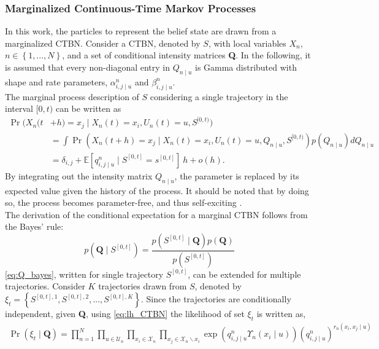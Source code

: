 \subsubsection{Marginalized Continuous-Time Markov Processes}
\label{sec:marg_ctbn}
In this work, the particles to represent the belief state are drawn from a marginalized CTBN. Consider a CTBN, denoted by $ S $, with local variables $ X_n $, $ n\in \left\lbrace 1,...,N \right\rbrace $, and a set of conditional intensity matrices \textbf{Q}. In the following, it is assumed that every non-diagonal entry in $ Q_{n\mid u} $ is Gamma distributed with shape and rate parameters, $ \alpha^n_{i,j\mid u} $ and $ \beta^n_{i,j\mid u} $.\\
The marginal process description of $ S $ considering a single trajectory in the interval $ [0,t) $ can be written as
\begin{align}
\operatorname{Pr}(X_n(t &+ h) = x_j \mid X_n(t)=x_i, U_n(t)=u, S^{[0, t)})\\
&= \int \operatorname{Pr}(X_n(t + h) = x_j \mid X_n(t)=x_i, U_n(t)=u, Q_{n\mid u}, S^{[0, t)})p(Q_{n\mid u})dQ_{n\mid u}\\
&= \delta_{i,j} + \mathbb{E}[q^n_{i,j\mid u} \mid S^{[0, t]} = s^{[0, t]}]\ h + o(h).
\label{eq:marginal_CTBN}
\end{align}
By integrating out the intensity matrix $ Q_{n\mid u} $, the parameter is replaced by its expected value given the history of the process. It should be noted that by doing so, the process becomes parameter-free, and thus self-exciting \cite{Studer2016}. \\
The derivation of the conditional expectation for a marginal CTBN follows from the Bayes' rule:
\begin{equation}
p\left(\textbf{Q} \mid S^{[0,t]}\right)=\frac{p\left(S^{[0,t]} \mid \textbf{Q}\right) p(\textbf{Q})}{p\left(S^{[0,t]}\right)}
\label{eq:Q_bayes}
\end{equation}
\autoref{eq:Q_bayes}, written for single trajectory $ S^{[0,t]} $, can be extended for multiple trajectories. Consider $ K $ trajectories drawn from $ S $, denoted by $ \xi_t = \left\lbrace S^{[0,t], 1}, S^{[0,t], 2}, ..., S^{[0,t], K} \right\rbrace  $. Since the trajectories are conditionally independent, given \textbf{Q}, using \autoref{eq:lh_CTBN} the likelihood of set $ \xi_t $ is written as,
\begin{align}
\operatorname{Pr}( \xi_t  \mid \textbf{Q} ) = \prod_{n=1}^{N} \prod_{u \in \mathcal{U}_{n}} \prod_{x_i \in \mathcal{X}_{n}} \prod_{x_j \in \mathcal{X}_{n} \backslash x_i}
\exp \left( q_{i,j\mid u}^{n} \Upsilon_{n}(x_i\mid u)\right) (q_{i,j\mid u}^{n})^{r_{n}(x_i, x_j\mid u)}
\label{eq:lh_dataset_CTBN}
\end{align}
